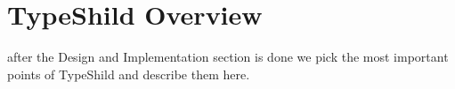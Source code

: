 \chapter{TypeShild Overview}
\label{chapter:TypeShild Overview}

after the Design and Implementation section is done
we pick the most important points of TypeShild and describe them here.

% 
% 
% 
% 
% 
